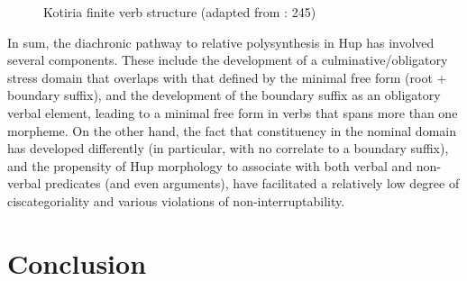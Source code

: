 \documentclass[output=paper]{langscibook}
\begin{document}
\begin{figure}
    \centering
    \caption{Kotiria finite verb structure (adapted from \citealt{Stenzel2013}: 245)}
{}
    \label{fig::hup:key:3}
\end{figure}

In sum, the diachronic pathway to relative polysynthesis in Hup has involved several components. These include the development of a culminative/obligatory stress domain that overlaps with that defined by the minimal free form (root + boundary suffix), and the development of the boundary suffix as an obligatory verbal element, leading to a minimal free form in verbs that spans more than one morpheme. On the other hand, the fact that constituency in the nominal domain has developed differently (in particular, with no correlate to a boundary suffix), and the propensity of Hup morphology to associate with both verbal and non-verbal predicates (and even arguments), have facilitated a relatively low degree of ciscategoriality and various violations of non-interruptability. 


\section{Conclusion}
\label{sec:hup:key:7}
\end{document}
